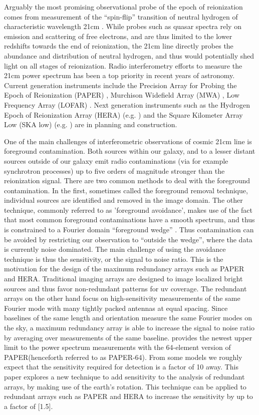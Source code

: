 \documentclass[preprint2,numberedappendix,tighten,twocolappendix]{aastex6}  %
\renewcommand\[{\begin{equation}}
\renewcommand\]{\end{equation}}
\begin{document}
Arguably the most promising observational probe of the epoch of reionization
comes from measurement of the ``spin-flip'' transition of neutral
hydrogen of characteristic wavelength 21cm \cite{Furlanetto2006181,PritchardLoeb}.
While probes such as quasar spectra rely on emission and scattering
of free electrons, and are thus limited to the lower redshifts towards the end of reionization, the 21cm line directly probes the
abundance and distribution of neutral hydrogen, and thus would potentially
shed light on all stages of reionization. Radio interferometry efforts
to measure the 21cm power spectrum has been a top priority in recent years of astronomy.
Current generation instruments include the Precision Array for Probing
the Epoch of Reionization (PAPER) \cite{Ali2015,paper32}, Murchison
Widefield Array (MWA) \cite{MWA}, Low Frequency Array (LOFAR) \cite{LOFAR}. Next generation instruments such as the Hydrogen Epoch of Reionization
Array (HERA) (e.g. \cite{HERA,HERAconfiguration,HERABEAM1,HERADISH2})
and the Square Kilometer Array Low (SKA low) (e.g. \cite{SKA1}) are
in planning and construction. 

One of the main challenges of interferometric observations of cosmic
21cm line is foreground contamination. Both sources within our
galaxy, and to a lesser distant sources outside of our galaxy emit
radio contaminations (via for example synchrotron processes) up to five orders of magnitude stronger than the
reionization signal. There are two common methods to deal with the
foreground contamination. In the first, sometimes called the foreground
removal technique, individual sources are identified and removed in the image domain.
The other technique, commonly referred to as 'foreground avoidance',
makes use of the fact that most common foreground contaminations have a smooth
spectrum, and thus is constrained to a Fourier domain ``foreground
wedge'' \cite{wedge1,wedge2}. Thus contamination can be avoided
by restricting our observation to ``outside the wedge'', where the data is currently noise dominated. The main
challenge of using the avoidance technique is thus the sensitivity, or
the signal to noise ratio. This is the motivation for the design of
the maximum redundancy arrays such as PAPER and HERA. Traditional
imaging arrays are designed to image localized bright sources and thus favor non-redundant patterns for uv coverage. The redundant arrays on the other hand
focus on high-sensitivity measurements of the same Fourier mode
with many tightly packed antennas at equal spacing. Since baselines
of the same length and orientation measure the same Fourier modes
on the sky, a maximum redundancy array is able to increase the
signal to noise ratio by averaging over measurements of the same baseline.
\cite{Ali2015} provides the newest upper limit to the power spectrum
measurements with the 64-element version of PAPER(henceforth referred to as PAPER-64). From some models we roughly expect
that the sensitivity required for detection is a factor of 10 away.
This paper explores a new technique to add sensitivity to the analysis
of redundant arrays, by making use of the earth's rotation. This technique
can be applied to redundant arrays such as PAPER and HERA to increase
the sensitivity by up to a factor of [1.5]. 
\end{document}
